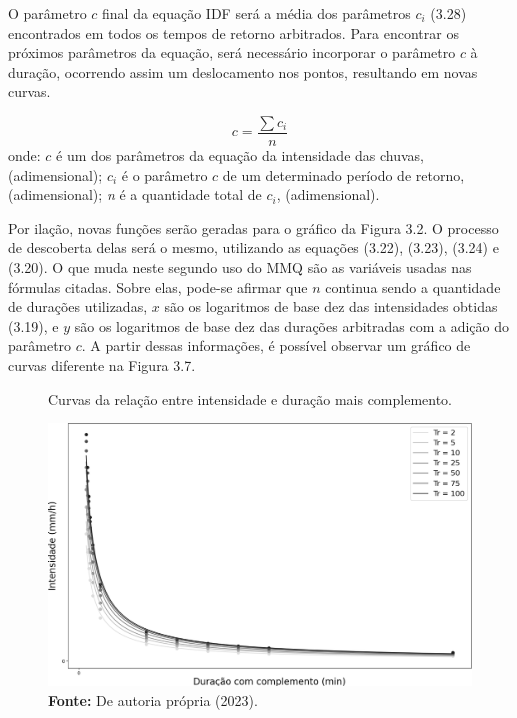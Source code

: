 O parâmetro $c$ final da equação IDF será a média dos parâmetros $c_i$ 
(3.28) encontrados em todos os tempos de retorno arbitrados. Para encontrar os próximos parâmetros da equação, será necessário incorporar o parâmetro $c$ à duração, ocorrendo assim um deslocamento nos pontos, resultando em novas curvas.\bigskip

\begin{equation}
c = \frac{\sum{c_i}}{n}
\end{equation}
\newline
\newline
\newline
onde:
\newline
\textit{$c$} é um dos parâmetros da equação da intensidade das chuvas, (adimensional);
\newline
\textit{$c_i$} é o parâmetro $c$ de um determinado período de retorno, (adimensional);
\newline
\textit{n} é a quantidade total de $c_i$, (adimensional).\bigskip

Por ilação, novas funções serão geradas para o gráfico da Figura 3.2. O processo de descoberta delas será o mesmo, utilizando as equações (3.22), (3.23), (3.24) e (3.20). O que muda neste segundo uso do MMQ são as variáveis usadas nas fórmulas citadas. Sobre elas, pode-se afirmar que $n$ continua sendo a quantidade de durações utilizadas, $x$ são os logaritmos de base dez das intensidades obtidas (3.19), e $y$ são os logaritmos de base dez das durações arbitradas com a adição do parâmetro $c$. A partir dessas informações, é possível observar um gráfico de curvas diferente na Figura 3.7.

\begin{figure}[!ht]
	\centering
	\caption{Curvas da relação entre intensidade e duração mais complemento.}
	\includegraphics[width=.7325\linewidth]{figuras/curvas_idf_de_intensidade_e_duracao_com_complemento.png}
	\caption*{\textbf{Fonte:} De autoria própria (2023).}
	\label{fig:curvas_idf_de_intensidade_e_duracao_com_complemento.png}
\end{figure}

